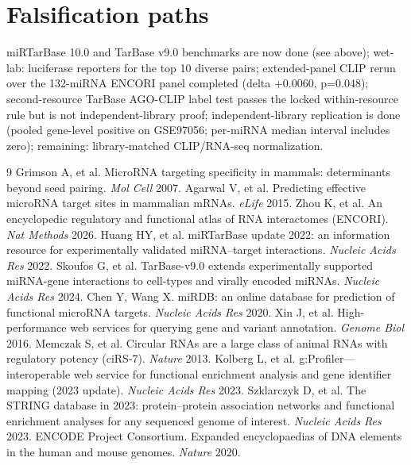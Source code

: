 \documentclass[11pt]{article}
\begin{document}
\section{Falsification paths}
miRTarBase 10.0 and TarBase v9.0 benchmarks are now done (see above); wet-lab: luciferase reporters for the top 10 diverse pairs; extended-panel CLIP rerun over the 132-miRNA ENCORI panel completed (delta +0.0060, p=0.048); second-resource TarBase AGO-CLIP label test passes the locked within-resource rule but is not independent-library proof; independent-library replication is done (pooled gene-level positive on GSE97056; per-miRNA median interval includes zero); remaining: library-matched CLIP/RNA-seq normalization.
\begin{thebibliography}{9}
 Grimson A, et al. MicroRNA targeting specificity in mammals: determinants beyond seed pairing. \emph{Mol Cell} 2007.
 Agarwal V, et al. Predicting effective microRNA target sites in mammalian mRNAs. \emph{eLife} 2015.
 Zhou K, et al. An encyclopedic regulatory and functional atlas of RNA interactomes (ENCORI). \emph{Nat Methods} 2026.
 Huang HY, et al. miRTarBase update 2022: an information resource for experimentally validated miRNA--target interactions. \emph{Nucleic Acids Res} 2022.
 Skoufos G, et al. TarBase-v9.0 extends experimentally supported miRNA-gene interactions to cell-types and virally encoded miRNAs. \emph{Nucleic Acids Res} 2024.
 Chen Y, Wang X. miRDB: an online database for prediction of functional microRNA targets. \emph{Nucleic Acids Res} 2020.
 Xin J, et al. High-performance web services for querying gene and variant annotation. \emph{Genome Biol} 2016.
 Memczak S, et al. Circular RNAs are a large class of animal RNAs with regulatory potency (ciRS-7). \emph{Nature} 2013.
 Kolberg L, et al. g:Profiler---interoperable web service for functional enrichment analysis and gene identifier mapping (2023 update). \emph{Nucleic Acids Res} 2023.
 Szklarczyk D, et al. The STRING database in 2023: protein--protein association networks and functional enrichment analyses for any sequenced genome of interest. \emph{Nucleic Acids Res} 2023.
 ENCODE Project Consortium. Expanded encyclopaedias of DNA elements in the human and mouse genomes. \emph{Nature} 2020.

\end{thebibliography}
\end{document}
